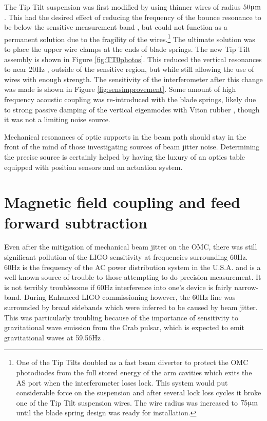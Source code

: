 The Tip Tilt suspension was first modified by using thinner wires of radius $50 \upmu \rm m$. %
This had the desired effect of reducing the frequency of the bounce resonance to be below the sensitive measurement band \cite{smallwirecoupling}, but could not function as a permanent solution due to the fragility of the wires.\footnote{One of the Tip Tilts doubled as a fast beam diverter to protect the OMC photodiodes from the full stored energy of the arm cavities which exits the AS port when the interferometer loses lock. %
This system would put considerable force on the suspension and after several lock loss cycles it broke one of the Tip Tilt suspension wires. %
The wire radius was increased to $75 \upmu \rm m$ until the blade spring design was ready for installation.} The ultimate solution was to place the upper wire clamps at the ends of blade springs. %
The new Tip Tilt assembly is shown in Figure \ref{fig:TT0photos}. %
This reduced the vertical resonances to near 20Hz \cite{bladebounce,bladebounceLHO}, outside of the sensitive region, but while still allowing the use of wires with enough strength. %
The sensitivity of the interferometer after this change was made is shown in Figure \ref{fig:sensimprovement}. %
Some amount of high frequency acoustic coupling was re-introduced with the blade springs, likely due to strong passive damping of the vertical eigenmodes with Viton rubber \cite{G1100330}, though it was not a limiting noise source.

Mechanical resonances of optic supports in the beam path should stay in the front of the mind of those investigating sources of beam jitter noise. %
Determining the precise source is certainly helped by having the luxury of an optics table equipped with position sensors and an actuation system.
\section{Magnetic field coupling and feed forward subtraction}
Even after the mitigation of mechanical beam jitter on the OMC, there was still significant pollution of the LIGO sensitivity at frequencies surrounding 60Hz. %
60Hz is the frequency of the AC power distribution system in the U.S.A. %
and is a well known source of trouble to those attempting to do precision measurement. %
It is not terribly troublesome if 60Hz interference into one's device is fairly narrow-band. %
During Enhanced LIGO commissioning however, the 60Hz line was surrounded by broad sidebands which were inferred to be caused by beam jitter. %
This was particularly troubling because of the importance of sensitivity to gravitational wave emission from the Crab pulsar, which is expected to emit gravitational waves at 59.56Hz \cite{Crab}.

